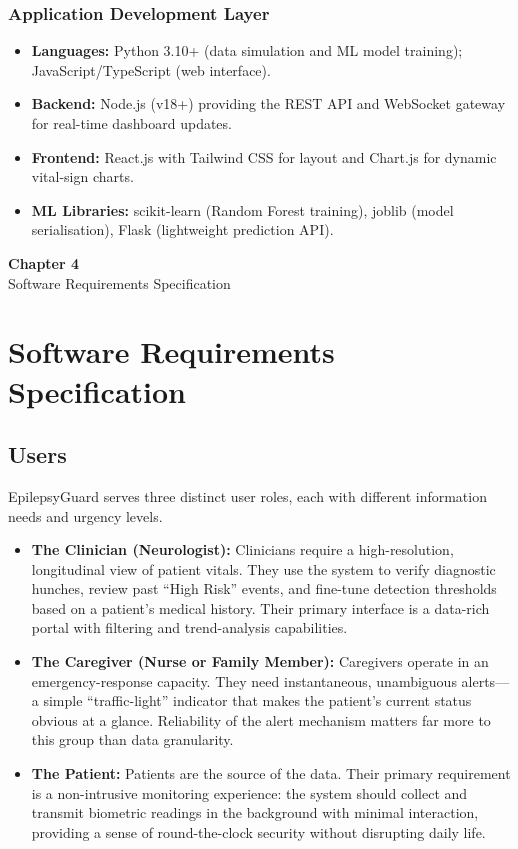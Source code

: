 \documentclass[12pt, a4paper, oneside]{report}
\newcommand{\chapterpage}[2]{
    \cleardoublepage
    \thispagestyle{empty}
    \vspace*{\fill}
    \begin{center}
        \huge \textbf{Chapter #1} \\
        \vspace{1cm}
        \Huge #2
    \end{center}
    \vspace*{\fill}
    \newpage
}
\begin{document}
\subsection{Application Development Layer}
\begin{itemize}
    \item \textbf{Languages:} Python 3.10+ (data simulation and ML model training); JavaScript/TypeScript (web interface).
    \item \textbf{Backend:} Node.js (v18+) providing the REST API and WebSocket gateway for real-time dashboard updates.
    \item \textbf{Frontend:} React.js with Tailwind CSS for layout and Chart.js for dynamic vital-sign charts.
    \item \textbf{ML Libraries:} scikit-learn (Random Forest training), joblib (model serialisation), Flask (lightweight prediction API).
\end{itemize}


\chapterpage{4}{Software Requirements Specification}
\chapter{Software Requirements Specification}

\section{Users}
EpilepsyGuard serves three distinct user roles, each with different information needs and urgency levels.

\begin{itemize}
    \item \textbf{The Clinician (Neurologist):} Clinicians require a high-resolution, longitudinal view of patient vitals. They use the system to verify diagnostic hunches, review past ``High Risk'' events, and fine-tune detection thresholds based on a patient's medical history. Their primary interface is a data-rich portal with filtering and trend-analysis capabilities.
    \item \textbf{The Caregiver (Nurse or Family Member):} Caregivers operate in an emergency-response capacity. They need instantaneous, unambiguous alerts---a simple ``traffic-light'' indicator that makes the patient's current status obvious at a glance. Reliability of the alert mechanism matters far more to this group than data granularity.
    \item \textbf{The Patient:} Patients are the source of the data. Their primary requirement is a non-intrusive monitoring experience: the system should collect and transmit biometric readings in the background with minimal interaction, providing a sense of round-the-clock security without disrupting daily life.
\end{itemize}
\end{document}
